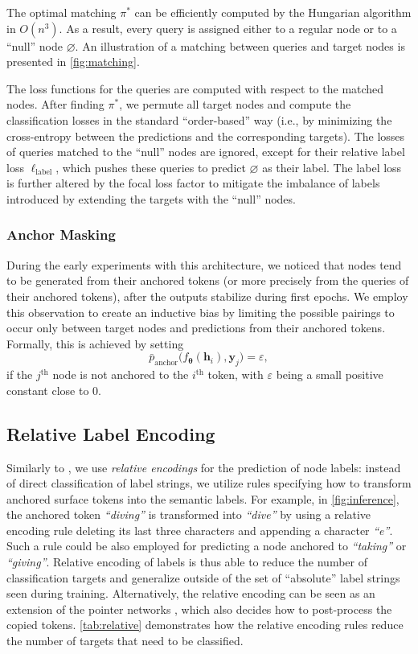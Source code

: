 \documentclass[11pt,a4paper]{article}
\begin{document}
The optimal matching $\pi^*$ can be efficiently computed by the Hungarian algorithm \cite{kuhn1955hungarian} in $O(n^3)$. As a result, every query is assigned either to a regular node or to a ``null'' node $\varnothing$.  An illustration of a matching between queries and target nodes is presented in \autoref{fig:matching}.

The loss functions for the queries are computed with respect to the matched nodes. After finding $\pi^*$, we permute all target nodes and compute the classification losses in the standard ``order-based'' way (i.e., by minimizing the cross-entropy between the predictions and the corresponding targets). The losses of queries matched to the ``null'' nodes are ignored, except for their relative label loss $\ell_{\textrm{label}}$, which pushes these queries to predict $\varnothing$ as their label. The label loss is further altered by the focal loss factor \cite{lin2017focal} to mitigate the imbalance of labels introduced by extending the targets with the ``null'' nodes.

\subsubsection{Anchor Masking}
\label{sec:anchor_masking}
During the early experiments with this architecture, we noticed that nodes tend to be generated from their anchored tokens (or more precisely from the queries of their anchored tokens), after the outputs stabilize during first epochs. We employ this observation to create an inductive bias by limiting the possible pairings to occur only between target nodes and predictions from their anchored tokens. Formally, this is achieved by setting
$$\bar{p}_{\textrm{anchor}}\big(f_{\bm{\theta}}(\mathbf{h}_i), \mathbf{y}_j\big) = \varepsilon,$$
if the $j^\textrm{th}$ node is not anchored to the $i^\textrm{th}$ token, with $\varepsilon$ being a small positive constant close to $0$. \subsection{Relative Label Encoding}
\label{section:encoding}

Similarly to \citet{straka2019udpipe,Str:Str:19}, we use \emph{relative encodings} for the prediction of node labels: instead of direct classification of label strings, we utilize rules specifying how to transform anchored surface tokens into the semantic labels. For example, in \autoref{fig:inference}, the anchored token \emph{``diving''} is transformed into \emph{``dive''} by using a relative encoding rule deleting its last three characters and appending a character \emph{``e''}. Such a rule could be also employed for predicting a node anchored to \emph{``taking''} or \emph{``giving''}. Relative encoding of labels is thus able to reduce the number of classification targets and generalize outside of the set of ``absolute'' label strings seen during training. Alternatively, the relative encoding can be seen as an extension of the pointer networks \cite{gu2016incorporating}, which also decides how to post-process the copied tokens. \autoref{tab:relative} demonstrates how the relative encoding rules reduce the number of targets that need to be classified.
\end{document}
